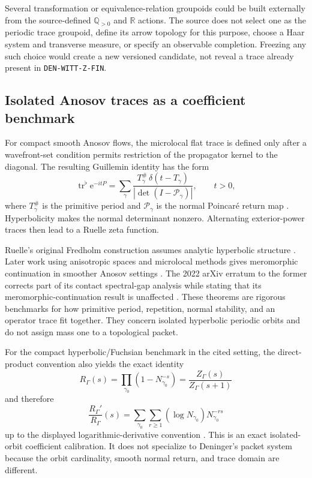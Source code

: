 \documentclass[11pt]{article}
\theoremstyle{definition}
\theoremstyle{remark}
\newcommand{\R}{\mathbb{R}}
\newcommand{\Q}{\mathbb{Q}}
\newcommand{\Tr}{\operatorname{tr}}
\newcommand{\e}{\mathrm{e}}
\begin{document}
Several transformation or equivalence-relation groupoids could be built
externally from the source-defined \(\Q_{>0}\) and \(\R\) actions.  The
source does not select one as the periodic trace groupoid, define its arrow
topology for this purpose, choose a Haar system and transverse measure, or
specify an observable completion.  Freezing any such choice would create a
new versioned candidate, not reveal a trace already present in
\texttt{DEN-WITT-Z-FIN}.

\subsection{Isolated Anosov traces as a coefficient benchmark}

For compact smooth Anosov flows, the microlocal flat trace is defined only
after a wavefront-set condition permits restriction of the propagator kernel
to the diagonal.  The resulting Guillemin identity has the form
\begin{equation}
 \Tr^\flat \e^{-itP}
  =\sum_{\gamma}
    \frac{T_\gamma^\#\,
    \delta(t-T_\gamma)}
    {|\det(I-\mathcal P_\gamma)|},
 \qquad t>0,
 \label{eq:guillemin}
\end{equation}
where \(T_\gamma^\#\) is the primitive period and
\(\mathcal P_\gamma\) is the normal Poincar\'e return map
\citep{DyatlovZworski2016}.  Hyperbolicity makes the normal determinant
nonzero.  Alternating exterior-power traces then lead to a Ruelle zeta
function.

Ruelle's original Fredholm construction assumes analytic hyperbolic
structure \citep{Ruelle1976}.  Later work using anisotropic spaces and
microlocal methods gives meromorphic continuation in smoother Anosov settings
\citep{GiuliettiLiveraniPollicott2013,DyatlovZworski2016}.  The 2022 arXiv
erratum to the former corrects part of its contact spectral-gap analysis while
stating that its meromorphic-continuation result is unaffected
\citep{GiuliettiLiveraniPollicottErratum2022}.  These theorems are rigorous
benchmarks for how primitive period, repetition, normal stability, and an
operator trace fit together.  They concern isolated hyperbolic periodic
orbits and do not assign mass one to a topological packet.

For the compact hyperbolic/Fuchsian benchmark in the cited setting, the
direct-product convention also yields the exact identity
\[
 R_\Gamma(s)
   =\prod_{\gamma_0}(1-N_{\gamma_0}^{-s})
   =\frac{Z_\Gamma(s)}{Z_\Gamma(s+1)}
\]
and therefore
\[
 \frac{R_\Gamma'}{R_\Gamma}(s)
   =\sum_{\gamma_0}\sum_{r\ge1}
     (\log N_{\gamma_0})N_{\gamma_0}^{-rs}
\]
up to the displayed logarithmic-derivative convention
\citep{Fried1986}.  This is an exact isolated-orbit coefficient calibration.
It does not specialize to Deninger's packet system because the orbit
cardinality, smooth normal return, and trace domain are different.
\end{document}
